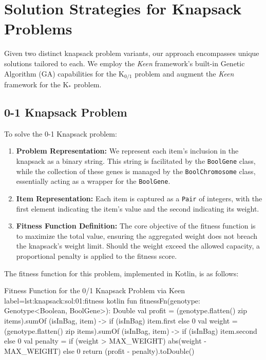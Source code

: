 \section{Solution Strategies for Knapsack Problems}
\label{sec:knapsack:sol}

  Given two distinct knapsack problem variants, our approach encompasses unique 
  solutions tailored to each.
  We employ the \textit{Keen} framework's built-in Genetic Algorithm (GA) 
  capabilities for the \(\mathrm{K}_{0 / 1}\) problem and augment the
  \textit{Keen} framework for the \( \mathrm{K}_{*} \) problem.

  \subsection{0-1 Knapsack Problem}
  \label{sec:knapsack:sol:01}

  To solve the 0-1 Knapsack problem:

  \begin{enumerate}
    \item \textbf{Problem Representation:} We represent each item's inclusion in 
      the knapsack as a binary string.
      This string is facilitated by the \texttt{BoolGene} class, while the 
      collection of these genes is managed by the \texttt{BoolChromosome} class, 
      essentially acting as a wrapper for the \texttt{BoolGene}.
    \item \textbf{Item Representation:} Each item is captured as a \texttt{Pair} 
      of integers, with the first element indicating the item's value and the 
      second indicating its weight.
    \item \textbf{Fitness Function Definition:} The core objective of the 
      fitness function is to maximize the total value, ensuring the aggregated 
      weight does not breach the knapsack's weight limit.
      Should the weight exceed the allowed capacity, a proportional penalty is 
      applied to the fitness score. 
  \end{enumerate}

  The fitness function for this problem, implemented in Kotlin, is as follows:

  \begin{code}{Fitness Function for the 0/1 Knapsack Problem via Keen}{
    label={lst:knapsack:sol:01:fitness}
  }{kotlin}
    fun fitnessFn(genotype: Genotype<Boolean, BoolGene>): Double {
        val profit = (genotype.flatten() zip items).sumOf { (isInBag, item) ->
            if (isInBag) item.first else 0
        }
        val weight = (genotype.flatten() zip items).sumOf { (isInBag, item) ->
            if (isInBag) item.second else 0
        }
        val penalty = if (weight > MAX_WEIGHT) abs(weight - MAX_WEIGHT) else 0
        return (profit - penalty).toDouble()
    }
  \end{code}
